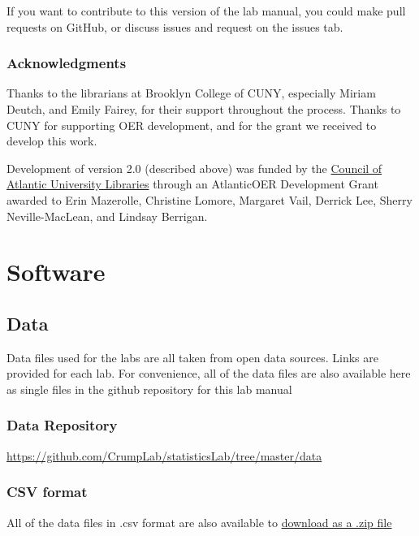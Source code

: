 \documentclass[
]{book}
\begin{document}
If you want to contribute to this version of the lab manual, you could make pull requests on GitHub, or discuss issues and request on the issues tab.

\hypertarget{acknowledgments}{%
\subsection{Acknowledgments}\label{acknowledgments}}

Thanks to the librarians at Brooklyn College of CUNY, especially Miriam Deutch, and Emily Fairey, for their support throughout the process. Thanks to CUNY for supporting OER development, and for the grant we received to develop this work.

Development of version 2.0 (described above) was funded by the \href{https://www.caul-cbua.ca/}{Council of Atlantic University Libraries} through an AtlanticOER Development Grant awarded to Erin Mazerolle, Christine Lomore, Margaret Vail, Derrick Lee, Sherry Neville-MacLean, and Lindsay Berrigan.

\hypertarget{software}{%
\chapter*{Software}\label{software}}

\hypertarget{data}{%
\section{Data}\label{data}}

Data files used for the labs are all taken from open data sources. Links are provided for each lab. For convenience, all of the data files are also available here as single files in the github repository for this lab manual

\hypertarget{data-repository}{%
\subsection{Data Repository}\label{data-repository}}

\url{https://github.com/CrumpLab/statisticsLab/tree/master/data}

\hypertarget{csv-format}{%
\subsection{CSV format}\label{csv-format}}

All of the data files in .csv format are also available to \href{https://raw.githubusercontent.com/CrumpLab/statisticsLab/master/data/data_csv.zip}{download as a .zip file}
\end{document}
